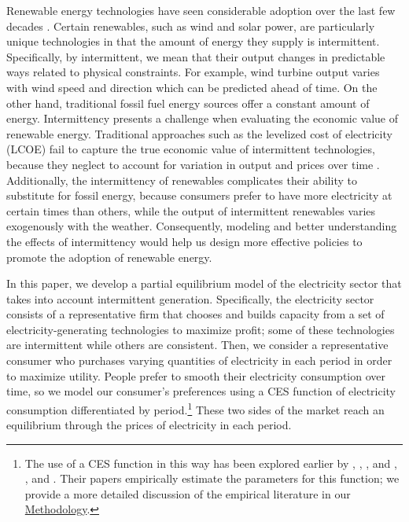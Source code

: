 \documentclass[11pt,a4paper,leqno]{extarticle}
\begin{document}
	
	
	
	Renewable energy technologies have seen considerable adoption over the last few decades \citep{EIArenew}. Certain renewables, such as wind and solar power, are particularly unique technologies in that the amount of energy they supply is intermittent. Specifically, by intermittent, we mean that their output changes in predictable ways related to physical constraints. For example, wind turbine output varies with wind speed and direction which can be predicted ahead of time. On the other hand, traditional fossil fuel energy sources offer a constant amount of energy. Intermittency presents a challenge when evaluating the economic value of renewable energy. Traditional approaches such as the levelized cost of electricity (LCOE) fail to capture the true economic value of intermittent technologies, because they neglect to account for variation in output and prices over time \citep{Joskow2011}. Additionally, the intermittency of renewables complicates their ability to substitute for fossil energy, because consumers prefer to have more electricity at certain times than others, while the output of intermittent renewables varies exogenously with the weather. Consequently, modeling and better understanding the effects of intermittency  would help us design more effective policies to promote the adoption of renewable energy. 
	
	
	In this paper, we develop a partial equilibrium model of the electricity sector that takes into account intermittent generation. Specifically, the electricity sector consists of a representative firm that chooses and builds capacity from a set of electricity-generating technologies to maximize profit; some of these technologies are intermittent while others are consistent. Then, we consider a representative consumer who purchases varying quantities of electricity in each period in order to maximize utility. People prefer to smooth their electricity consumption over time, so we model our consumer's preferences using a CES function of electricity consumption differentiated by period.\footnote{ The use of a CES function in this way has been explored earlier by \citet{Schwarz}, \citet{Schwarz}, \citet{Herriges}, and \citet{KS1994}, \citet{Aubin}, and \citet{Moha2016}. Their papers empirically estimate the parameters for this function; we provide a more detailed discussion of the empirical literature in our \hyperref[sec:methodology]{Methodology}.} These two sides of the market reach an equilibrium through the prices of electricity in each period. 
	
\end{document}
